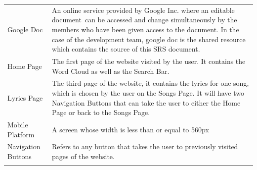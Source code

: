\documentclass[]{article}
\begin{document}
\begin{longtable}[c]{@{}ll@{}}
\begin{minipage}[t]{0.47\columnwidth}\raggedright
Google Doc
\end{minipage} & \begin{minipage}[t]{0.47\columnwidth}\raggedright
An online service provided by Google Inc. where an editable document~can
be accessed and change simultaneously by the members who have been given
access to the document. In the case of the development team, google doc
is the shared resource which contains the source of this SRS document.
\end{minipage}
\\\addlinespace
\begin{minipage}[t]{0.47\columnwidth}\raggedright
Home Page
\end{minipage} & \begin{minipage}[t]{0.47\columnwidth}\raggedright
The first page of the website visited by the user. It contains the Word
Cloud as well as the Search Bar.
\end{minipage}
\\\addlinespace
\begin{minipage}[t]{0.47\columnwidth}\raggedright
Lyrics Page
\end{minipage} & \begin{minipage}[t]{0.47\columnwidth}\raggedright
The third page of the website, it contains the lyrics for one song,
which is chosen by the user on the Songs Page. It will have two
Navigation Buttons that can take the user to either the Home Page or
back to the Songs Page.
\end{minipage}
\\\addlinespace
\begin{minipage}[t]{0.47\columnwidth}\raggedright
Mobile Platform
\end{minipage} & \begin{minipage}[t]{0.47\columnwidth}\raggedright
A screen whose width is less than or equal to 560px
\end{minipage}
\\\addlinespace
\begin{minipage}[t]{0.47\columnwidth}\raggedright
Navigation Buttons
\end{minipage} & \begin{minipage}[t]{0.47\columnwidth}\raggedright
Refers to any button that takes the user to previously visited pages of
the website.
\end{minipage}
\\\addlinespace
\begin{minipage}[t]{0.47\columnwidth}\raggedright

\end{minipage}
\end{longtable}
\end{document}
